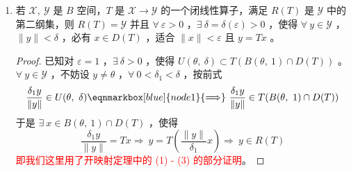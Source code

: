 \begin{enumerate}[leftmargin=2cm, label=\arabic*]
\begin{proof}
			而后我们证明：$TB(\theta,\ 1)\supset U(\theta,\ \delta)$ ，$\forall\ y_0\in U(\theta,\ \delta)$ ，要证明 $\exists\ x_0\in B(\theta,\ 1)$ ，使得 $Tx_0=y_0$ 。即求方程 $Tx = y_0$ 在 $B(\theta,\ 1)$ 的一个解。我们利用逐步逼近法即可。对于 $y_0\in U(\theta,\ \delta)$ ，考虑 $\exists\ x_1\in B(0,\ \frac{1}{3})$ ，使得 $\|y_0 - Tx_1\| < \frac{\delta}{3}$ 。
			
			而后对 $y = y_0 - Tx_1\in U(\theta,\ \frac{\delta}{3})$ ，$\exists\ x_2\in B(\theta,\ \frac{1}{3^2})$ ，使得
			\begin{align*}
				\|y_1 - Tx_2\| < \frac{\delta}{3^2}
			\end{align*}
			而后我们构建的这一组，令 $x_0 \triangleq \sum\limits_{n=1}^{\infty} x_n$ ，便有 $x_0 \in B(0,\ 1)$ ，而 
			\begin{align*}
				\|y_n\| = \|y_{n-1} - Tx_n\| = \|y_0 - T(x_1 + x_2 + \cdots + x_n)\| < \frac{\delta}{3^n} \to 0
			\end{align*}
			而由于 $T$ 是连续的，故而 $Tx_0 = y_0$ 。即 $Y(\theta,\ \delta) \subset TB(\theta,\ 1)$ 。 
		\end{proof}
		\item 若 $\mathscr{X},\ \mathscr{Y}$ 是 $B$ 空间，$T$ 是 $\mathscr{X}\to\mathscr{Y}$ 的一个闭线性算子，满足 $R(T)$ 是 $\mathscr{Y}$ 中的第二纲集，则 $R(T) =\mathscr{Y}$ 并且 $\forall\ \varepsilon > 0$ ，$\exists\ \delta = \delta(\varepsilon) > 0$ ，使得 $\forall\ y\in\mathscr{Y}$ ，$\|y\|<\delta$ ，必有 $x\in D(T)$ ，适合 $\|x\| < \varepsilon$ 且 $y = Tx$ 。
		\begin{proof}
			已知对 $\varepsilon = 1$ ，$\exists\ \delta > 0$ ，使得 $U(\theta,\ \delta) \subset T(B(\theta,\ 1) \cap D(T))$ 。$\forall\ y\in\mathscr{Y}$ ，不妨设 $y\neq \theta$ ，$\forall\ 0<\delta_1 < \delta$ ，按前式
			\begin{equation*}
				\frac{\delta_1 y}{\|y\|} \in U(\theta,\ \delta) \eqnmarkbox[blue]{node1}{\Longrightarrow}\ \frac{\delta_1 y}{\|y\|}\in T(B(\theta,\ 1) \cap D(T))
			\end{equation*}
			于是 $\exists\ x\in B(\theta,\ 1)\cap D(T)$ ，使得
			\begin{equation*}
				\frac{\delta_1 y}{\|y\|} = Tx \Longrightarrow\ y = T\left(\frac{\|y\|}{\delta_1}x\right) \Longrightarrow\ y\in R(T)
			\end{equation*}
			\textcolor{red}{即我们这里用了开映射定理中的 (1) - (3) 的部分证明}。
		\end{proof}

\end{enumerate}
